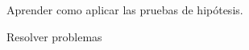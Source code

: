 \begin{sumilla}
\begin{unit}
   \begin{objetivos}
         \item  Aprender como aplicar las pruebas de hip\'otesis.
         \item  Resolver problemas
   \end{objetivos}
\end{unit}

\begin{bibliografia}
\end{bibliografia}

\end{sumilla}



